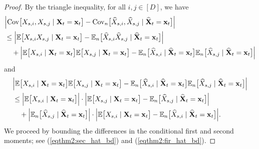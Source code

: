\documentclass[11pt,a4paper,final]{article}
\numberwithin{equation}{section}
\theoremstyle{remark}
\newcommand{\bx}{{\bf x}}
\newcommand{\bX}{{\bf X}}
\newcommand{\bbE}{{\mathbb E}}
\newcommand{\be}{\begin{equation}}
\newcommand{\ee}{\end{equation}}
\begin{document}
\begin{proof}
By the triangle inequality, for all $i,j \in [D]$, we have
\be
\begin{split}
& \Big\vert \text{Cov} \big[ X_{s,i}, X_{s,j} \mid \bX_{t} = \bx_{t} \big]  -
\text{Cov}_n \big[ \widehat X_{s,i}, \widehat X_{s,j} \mid  \widehat \bX_{t} = \bx_{t} \big] \Big\vert
\\
& \leq \Big\vert \bbE \big[ X_{s,i} X_{s,j} \mid \bX_{t} = \bx_{t} \big]  -
\bbE_n \big[ \widehat X_{s,i} \widehat X_{s,j} \mid  \widehat \bX_{t} = \bx_{t} \big] \Big\vert
\\
& \quad +
\Big\vert \bbE \big[ X_{s,i} \mid \bX_{t} = \bx_{t} \big] \bbE \big[ X_{s,j} \mid \bX_{t} = \bx_{t} \big]   -
\bbE_n \big[ \widehat X_{s,i} \mid  \widehat \bX_{t} = \bx_{t} \big]
\bbE_n \big[ \widehat X_{s,j} \mid  \widehat \bX_{t} = \bx_{t} \big]
\Big\vert
\label{eqthm2:cov_toy_bd1}
\end{split}
\ee
and
\be
\begin{split}
& \Big\vert \bbE \big[ X_{s,i} \mid \bX_{t} = \bx_{t} \big] \bbE \big[ X_{s,j} \mid \bX_{t} = \bx_{t} \big]   -
\bbE_n \big[ \widehat X_{s,i} \mid  \widehat \bX_{t} = \bx_{t} \big]
\bbE_n \big[ \widehat X_{s,j} \mid  \widehat \bX_{t} = \bx_{t} \big]
\Big\vert
\\
& \leq \Big\vert \bbE \big[ X_{s,i} \mid \bX_{t} = \bx_{t} \big] \Big\vert
\cdot
\Big\vert \bbE \big[ X_{s,j} \mid \bX_{t} = \bx_{t} \big]   -
\bbE_n \big[ \widehat X_{s,j} \mid  \widehat \bX_{t} = \bx_{t} \big]
\Big\vert
\\
& \quad + \Big\vert 
\bbE_n \big[ \widehat X_{s,j} \mid  \widehat \bX_{t} = \bx_{t} \big]
\Big\vert
\cdot
\Big\vert \bbE \big[ X_{s,i} \mid \bX_{t} = \bx_{t} \big]    -
\bbE_n \big[ \widehat X_{s,i} \mid  \widehat \bX_{t} = \bx_{t} \big]
\Big\vert.
\label{eqthm2:cov_toy_bd2}
\end{split}
\ee
We proceed by bounding the differences in the conditional first and second moments; see (\ref{eqthm2:sec_hat_bd}) and (\ref{eqthm2:fir_hat_bd}).


\end{proof}
\end{document}
